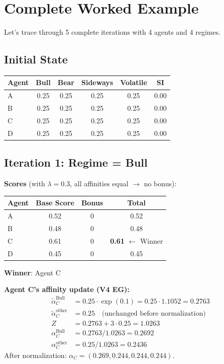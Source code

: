 \documentclass[11pt,a4paper]{article}
\theoremstyle{definition}
\theoremstyle{plain}
\begin{document}
\section{Complete Worked Example}

Let's trace through 5 complete iterations with 4 agents and 4 regimes.

\subsection{Initial State}

\begin{center}
\begin{tabular}{l|cccc|c}
\toprule
Agent & Bull & Bear & Sideways & Volatile & SI \\
\midrule
A & 0.25 & 0.25 & 0.25 & 0.25 & 0.00 \\
B & 0.25 & 0.25 & 0.25 & 0.25 & 0.00 \\
C & 0.25 & 0.25 & 0.25 & 0.25 & 0.00 \\
D & 0.25 & 0.25 & 0.25 & 0.25 & 0.00 \\
\bottomrule
\end{tabular}
\end{center}

\subsection{Iteration 1: Regime = Bull}

\textbf{Scores} (with $\lambda = 0.3$, all affinities equal $\to$ no bonus):
\begin{center}
\begin{tabular}{lccc}
\toprule
Agent & Base Score & Bonus & Total \\
\midrule
A & 0.52 & 0 & 0.52 \\
B & 0.48 & 0 & 0.48 \\
C & 0.61 & 0 & \textbf{0.61} $\leftarrow$ Winner \\
D & 0.45 & 0 & 0.45 \\
\bottomrule
\end{tabular}
\end{center}

\textbf{Winner}: Agent C

\textbf{Agent C's affinity update (V4 EG):}
\begin{align}
\tilde{\alpha}_C^{\text{Bull}} &= 0.25 \cdot \exp(0.1) = 0.25 \cdot 1.1052 = 0.2763 \\
\tilde{\alpha}_C^{\text{other}} &= 0.25 \quad \text{(unchanged before normalization)} \\
Z &= 0.2763 + 3 \cdot 0.25 = 1.0263 \\
\alpha_C^{\text{Bull}} &= 0.2763 / 1.0263 = 0.2692 \\
\alpha_C^{\text{other}} &= 0.25 / 1.0263 = 0.2436
\end{align}
After normalization: $\alpha_C = (0.269, 0.244, 0.244, 0.244)$.
\end{document}
